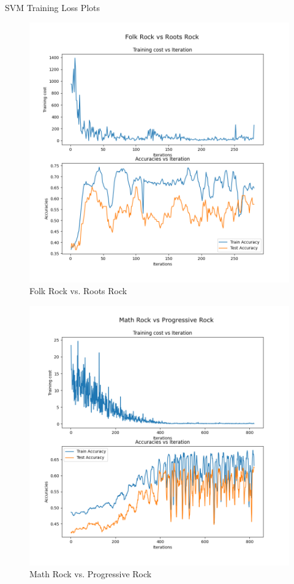 \documentclass[letterpaper, 12 pt, conference]{ieeeconf}  %
\begin{document}
\par SVM Training Loss Plots
\begin{figure}[H]
\centering
\includegraphics[width=.75\linewidth]{frrr_svm.png}
\caption{Folk Rock vs. Roots Rock}
\label{fig:svmtrain1}
\end{figure}
\begin{figure}[H]
\centering
\includegraphics[width=.75\linewidth]{mrpr_svm.png}
\caption{Math Rock vs. Progressive Rock}
\label{fig:svmtrain2}
\end{figure}
\end{document}
